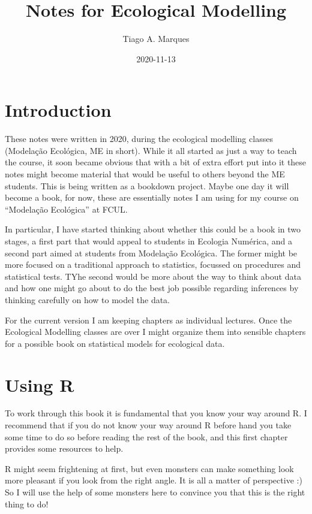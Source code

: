 \documentclass[
]{book}
\title{Notes for Ecological Modelling}
\author{Tiago A. Marques}
\date{2020-11-13}
\begin{document}
\maketitle

{
\setcounter{tocdepth}{1}
\tableofcontents
}
\hypertarget{introduction}{%
\chapter{Introduction}\label{introduction}}

These notes were written in 2020, during the ecological modelling classes (Modelação Ecológica, ME in short). While it all started as just a way to teach the course, it soon became obvious that with a bit of extra effort put into it these notes might become material that would be useful to others beyond the ME students. This is being written as a bookdown project. Maybe one day it will become a book, for now, these are essentially notes I am using for my course on ``Modelação Ecológica'' at FCUL.

In particular, I have started thinking about whether this could be a book in two stages, a first part that would appeal to students in Ecologia Numérica, and a second part aimed at students from Modelação Ecológica. The former might be more focused on a traditional approach to statistics, focussed on procedures and statistical tests. TYhe second would be more about the way to think about data and how one might go about to do the best job possible regarding inferences by thinking carefully on how to model the data.

For the current version I am keeping chapters as individual lectures. Once the Ecological Modelling classes are over I might organize them into sensible chapters for a possible book on statistical models for ecological data.

\hypertarget{usingRintro}{%
\chapter{Using R}\label{usingRintro}}

To work through this book it is fundamental that you know your way around R. I recommend that if you do not know your way around R before hand you take some time to do so before reading the rest of the book, and this first chapter provides some resources to help.

R might seem frightening at first, but even monsters can make something look more pleasant if you look from the right angle. It is all a matter of perspective :) So I will use the help of some monsters here to convince you that this is the right thing to do!
\end{document}

